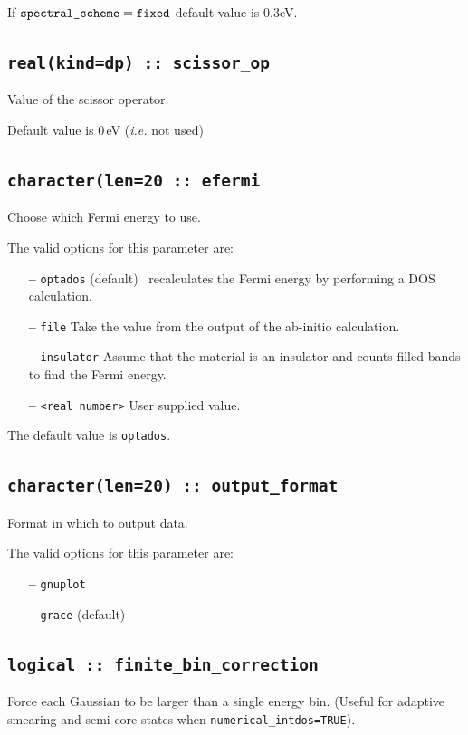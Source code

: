 \documentclass[a4paper,11pt,twoside]{book}
\begin{document}
If $\verb#spectral_scheme# = \verb#fixed#$ default value is 0.3eV.

\subsection[scissor\_op]{\tt real(kind=dp) :: scissor\_op}
Value of the scissor operator. 

Default value is 0\,eV (\emph{i.e.} not used)

\subsection[compute\_efermi]{{\tt character(len=20 :: efermi}}
Choose which Fermi energy to use.

The valid options for this parameter are:
\begin{itemize}
\item[{\bf --}]  \verb#optados# (default) \optados\ recalculates the Fermi energy by performing a DOS calculation. 
\item[{\bf --}]  \verb#file# Take the value from the output of the ab-initio calculation.
\item[{\bf --}]  \verb#insulator# Assume that the material is an insulator and counts filled bands to find the Fermi energy.
\item[{\bf --}]  \verb#<real number># User supplied value.
\end{itemize}

The default value is {\tt optados}.


\subsection[output\_format]{\tt character(len=20) :: output\_format}
Format in which to output data.

The valid options for this parameter are:
\begin{itemize}
\item[{\bf --}]  \verb#gnuplot# 
\item[{\bf --}]  \verb#grace# (default)
\end{itemize}

\subsection[finite\_bin\_correction]{\tt logical :: finite\_bin\_correction}
Force each Gaussian to be larger than a single energy bin. (Useful for adaptive smearing and semi-core states when \verb#numerical_intdos=TRUE#). 
\end{document}
